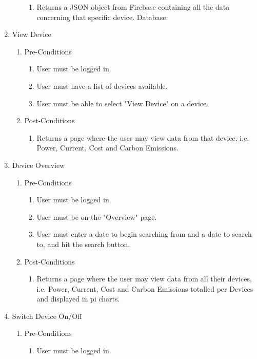 \documentclass{article}
\begin{document}
\begin{enumerate}
\begin{enumerate}
\begin{enumerate}
				\item	Returns a JSON object from Firebase containing all the data concerning that specific device. Database.
			\end{enumerate}
		\end{enumerate}
		\item	View Device
		\begin{enumerate}
			\item  Pre-Conditions
			\begin{enumerate}
				\item	User must be logged in.
				\item	User must have a list of devices available.
				\item	User must be able to select "View Device" on a device.
			\end{enumerate}
			\item  Post-Conditions		
			\begin{enumerate}
				\item	Returns a page where the user may view data from that device, i.e. Power, Current, Cost and Carbon 
				Emissions.
			\end{enumerate}
		\end{enumerate}
		\item	Device Overview
		\begin{enumerate}
			\item  Pre-Conditions
			\begin{enumerate}
				\item	User must be logged in.
				\item	User must be on the "Overview" page.
				\item	User must enter a date to begin searching from and a date to search to, and hit the search button.
			\end{enumerate}
			\item  Post-Conditions		
			\begin{enumerate}
				\item	Returns a page where the user may view data from all their devices, i.e. Power, Current, Cost and 
				Carbon Emissions totalled per Devices and displayed in pi charts.
			\end{enumerate}
		\end{enumerate}
		\item	Switch Device On/Off
		\begin{enumerate}
			\item  Pre-Conditions
			\begin{enumerate}
				\item	User must be logged in.

\end{enumerate}
\end{enumerate}
\end{enumerate}
\end{document}
